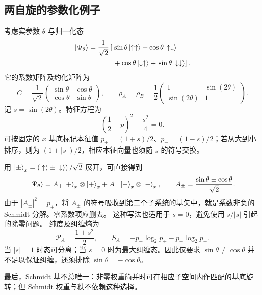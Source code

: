 \subsection{两自旋的参数化例子}
考虑实参数 $\theta$ 与归一化态
\begin{align}
\Ket{\Psi_\theta}=\frac1{\sqrt2}\left[\vphantom{\Ket{\uparrow\uparrow}}\right.&\sin\theta\Ket{\uparrow\uparrow}
+\cos\theta\Ket{\uparrow\downarrow}\notag\\
&+\cos\theta\Ket{\downarrow\uparrow}
+\left.\sin\theta\Ket{\downarrow\downarrow}\right].
\end{align}
它的系数矩阵及约化矩阵为
\begin{equation}
C=\frac1{\sqrt2}\left(\begin{matrix}\sin\theta&\cos\theta\\\cos\theta&\sin\theta\end{matrix}\right),\qquad
\rho_A=\rho_B=\frac12\left(\begin{matrix}1&\sin\left(2\theta\right)\\\sin\left(2\theta\right)&1\end{matrix}\right).
\end{equation}
记 $s=\sin\left(2\theta\right)$。特征方程为
\begin{equation}
\left(\frac12-p\right)^2-\frac{s^2}{4}=0.
\end{equation}
可按固定的 $x$ 基底标记本征值 $p_+=\left(1+s\right)/2$、$p_-=\left(1-s\right)/2$；若从大到小排序，则为 $\left(1\pm\left|s\right|\right)/2$，相应本征向量也须随 $s$ 的符号交换。

用 $\Ket{\pm}_x=\left(\Ket{\uparrow}\pm\Ket{\downarrow}\right)/\sqrt2$ 展开，可直接得到
\begin{equation}
\Ket{\Psi_\theta}=A_+\Ket{+}_x\otimes\Ket{+}_x
+A_-\Ket{-}_x\otimes\Ket{-}_x,\qquad
A_\pm=\frac{\sin\theta\pm\cos\theta}{\sqrt2}.
\end{equation}
由于 $\left|A_\pm\right|^2=p_\pm$，将 $A_\pm$ 的符号吸收到第二个子系统的基矢中，就是系数非负的 Schmidt 分解。零系数项应删去。
这种写法也适用于 $s=0$，避免使用 $s/\left|s\right|$ 引起的除零问题。
纯度及纠缠熵为
\begin{equation}
\mathcal P_A=\frac{1+s^2}{2},\qquad
S_A=-p_+\log_2p_+-p_-\log_2p_-.
\end{equation}
当 $\left|s\right|=1$ 时态可分离；当 $s=0$ 时为最大纠缠态。因此仅要求 $\sin\theta\neq\cos\theta$ 并不足以保证纠缠，还须排除 $\sin\theta=-\cos\theta$。

最后，Schmidt 基不总唯一：非零权重简并时可在相应子空间内作匹配的基底旋转；但 Schmidt 权重与秩不依赖这种选择。

